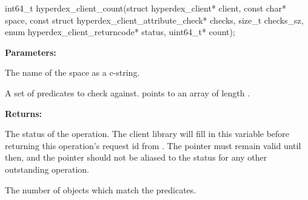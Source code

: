 \funcsep
{}
\begin{ccode}
int64_t hyperdex_client_count(struct hyperdex_client* client,
                const char* space,
                const struct hyperdex_client_attribute_check* checks, size_t checks_sz,
                enum hyperdex_client_returncode* status,
                uint64_t* count);
\end{ccode}
\funcdesc 

\noindent\textbf{Parameters:}
\begin{description}[labelindent=\widthof{{\code{checks}, \code{checks\_sz}}},leftmargin=*,noitemsep,nolistsep,align=right]
\item[\code{space}] The name of the space as a c-string.
\item[\code{checks}, \code{checks\_sz}] A set of predicates to check against.   points to an array of length .
\end{description}

\noindent\textbf{Returns:}
\begin{description}[labelindent=\widthof{{\code{status}}},leftmargin=*,noitemsep,nolistsep,align=right]
\item[\code{status}] The status of the operation.  The client library will fill in this variable before returning this operation's request id from .  The pointer must remain valid until then, and the pointer should not be aliased to the status for any other outstanding operation.
\item[\code{count}] The number of objects which match the predicates.
\end{description}
